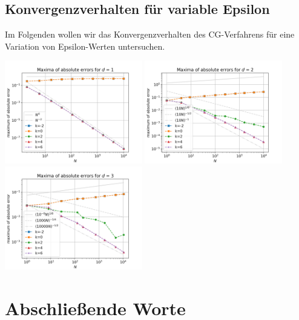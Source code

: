 \documentclass{scrartcl}
\begin{document}
\subsection{Konvergenzverhalten für variable Epsilon}
Im Folgenden wollen wir das Konvergenzverhalten des CG-Verfahrens für eine Variation von Epsilon-Werten untersuchen. 


{
  \centering
    \includegraphics[width=0.45\textwidth]{Grafiken/epsilon_d1}
    \includegraphics[width=0.45\textwidth]{Grafiken/epsilon_d2}
    \includegraphics[width=0.45\textwidth]{Grafiken/epsilon_d3}
    \vspace{-0.2cm}
}
\vspace{0.5cm}


\pagebreak
\section{Abschließende Worte}

\pagebreak


\end{document}
